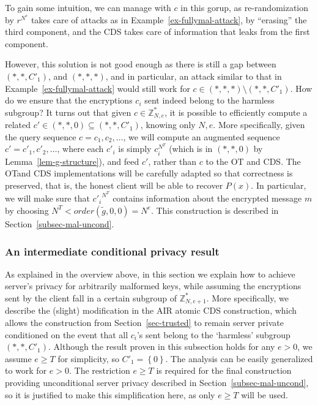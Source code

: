 \documentclass[11pt]{article}
\newcommand{\set}[1]{\left\{#1\right\}}
\newcommand{\ot}{\mbox{OT}\;}
\newcommand{\U}[1]{\mathbb{Z}_{#1}^*}
\begin{document}
To gain some intuition, we can manage with $c$ in this gorup, as re-randomization by $r^{N^e}$ takes care of attacks as in Example~\ref{ex-fullymal-attack}, by ``erasing'' the third component, and the CDS takes care of
information that leaks from the first component.

However, this solution is not good enough as there is still a gap between
$(*,*,C'_1)$, and $(*,*,*)$, and
in particular, an attack similar to that in Example~\ref{ex-fullymal-attack} would still work for $c\in (*,*,*)\setminus{(*,*,C'_1)}$.
How do we ensure that the encryptions $c_i$ sent indeed belong to the harmless
subgroup? 
It turns out that given $c\in \U{N,e}$, it is possible to efficiently compute a
related $c'\in (*,*,0)\subseteq(*,*,C'_1)$, knowing only $N,e$. More
specifically, given the query sequence $c=c_1,c_2,\ldots$, we will
compute an augmented sequence $c'=c'_1,c'_2,\ldots$, where each
$c'_i$ is simply $c^{N^T}_i$ (which is in $(*,*,0)$ by
Lemma~\ref{lem-g-structure}), and feed $c'$, rather than $c$ to the \ot
and CDS. The \ot and CDS implementations will be carefully adapted so
that correctness is preserved, that is, the honest client will be
able to recover $P(x)$. In particular, we will make sure that ${c'_i}^{N^T}$ contains information about the encrypted message $m$ by choosing $N^T<order(\tilde{g},0,0)=N^e$.
This construction is described in Section~\ref{subsec-mal-uncond}.
\subsubsection{An intermediate conditional privacy result}
\label{subsec-mal-cond}
As explained in the overview above, in this section we explain how to achieve server's privacy for arbitrarily malformed keys, while assuming
the encryptions sent by the client fall in a certain subgroup of $\U{N,e+1}$. 
More specifically, we describe the (slight) modification in the AIR atomic CDS construction, which allows the
construction from Section~\ref{sec-trusted} to remain server private conditioned on the event that all $c_i$'s sent belong to the `harmless' subgroup $(*,*,C'_1)$.
Although the result proven in this subsection holds for
any $e>0$, we assume $e\geq T$ for simplicity, so $C'_1=\set{0}$. The analysis can be easily generalized
to work for $e>0$. The restriction $e\geq T$ is required for the final construction providing unconditional server privacy described in Section~\ref{subsec-mal-uncond},
so it is justified to make this simplification here, as only $e\geq T$ will be used.
\end{document}
